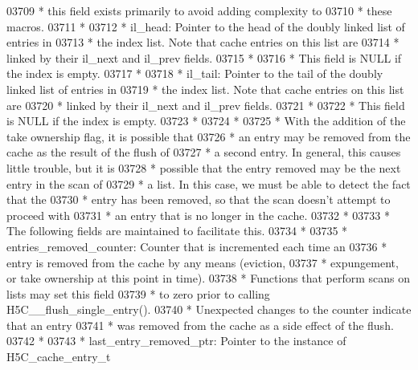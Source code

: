 \begin{DoxyCode}
03709 \textcolor{comment}{ *      this field exists primarily to avoid adding complexity to}
03710 \textcolor{comment}{ *      these macros.}
03711 \textcolor{comment}{ *}
03712 \textcolor{comment}{ * il\_head: Pointer to the head of the doubly linked list of entries in}
03713 \textcolor{comment}{ *              the index list.  Note that cache entries on this list are }
03714 \textcolor{comment}{ *      linked by their il\_next and il\_prev fields.}
03715 \textcolor{comment}{ *}
03716 \textcolor{comment}{ *              This field is NULL if the index is empty.}
03717 \textcolor{comment}{ *}
03718 \textcolor{comment}{ * il\_tail: Pointer to the tail of the doubly linked list of entries in}
03719 \textcolor{comment}{ *              the index list.  Note that cache entries on this list are }
03720 \textcolor{comment}{ *              linked by their il\_next and il\_prev fields.}
03721 \textcolor{comment}{ *}
03722 \textcolor{comment}{ *              This field is NULL if the index is empty.}
03723 \textcolor{comment}{ *}
03724 \textcolor{comment}{ *}
03725 \textcolor{comment}{ * With the addition of the take ownership flag, it is possible that }
03726 \textcolor{comment}{ * an entry may be removed from the cache as the result of the flush of }
03727 \textcolor{comment}{ * a second entry.  In general, this causes little trouble, but it is }
03728 \textcolor{comment}{ * possible that the entry removed may be the next entry in the scan of }
03729 \textcolor{comment}{ * a list.  In this case, we must be able to detect the fact that the }
03730 \textcolor{comment}{ * entry has been removed, so that the scan doesn't attempt to proceed with}
03731 \textcolor{comment}{ * an entry that is no longer in the cache.}
03732 \textcolor{comment}{ *}
03733 \textcolor{comment}{ * The following fields are maintained to facilitate this.}
03734 \textcolor{comment}{ *}
03735 \textcolor{comment}{ * entries\_removed\_counter: Counter that is incremented each time an}
03736 \textcolor{comment}{ *      entry is removed from the cache by any means (eviction, }
03737 \textcolor{comment}{ *      expungement, or take ownership at this point in time).}
03738 \textcolor{comment}{ *      Functions that perform scans on lists may set this field}
03739 \textcolor{comment}{ *      to zero prior to calling H5C\_\_flush\_single\_entry().  }
03740 \textcolor{comment}{ *      Unexpected changes to the counter indicate that an entry }
03741 \textcolor{comment}{ *      was removed from the cache as a side effect of the flush.}
03742 \textcolor{comment}{ *}
03743 \textcolor{comment}{ * last\_entry\_removed\_ptr:  Pointer to the instance of H5C\_cache\_entry\_t}

\end{DoxyCode}
